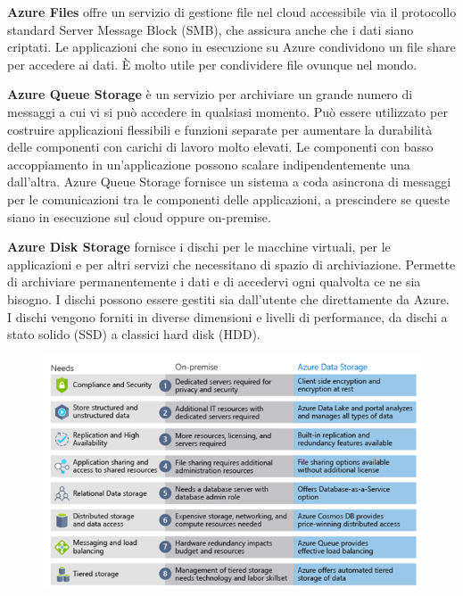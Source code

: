\textbf{Azure Files} offre un servizio di gestione file nel cloud accessibile via il protocollo standard Server Message Block (SMB), che assicura anche che i dati siano criptati. Le applicazioni che sono in esecuzione su Azure condividono un file share per accedere ai dati. È molto utile per condividere file ovunque nel mondo.

\textbf{Azure Queue Storage} è un servizio per archiviare un grande numero di messaggi a cui vi si può accedere in qualsiasi momento. Può essere utilizzato per costruire applicazioni flessibili e funzioni separate per aumentare la durabilità delle componenti con carichi di lavoro molto elevati. Le componenti con basso accoppiamento in un'applicazione possono scalare indipendentemente una dall'altra. Azure Queue Storage fornisce un sistema a coda asincrona di messaggi per le comunicazioni tra le componenti delle applicazioni, a prescindere se queste siano in esecuzione sul cloud oppure on-premise. 

\textbf{Azure Disk Storage} fornisce i dischi per le macchine virtuali, per le applicazioni e per altri servizi che necessitano di spazio di archiviazione. Permette di archiviare permanentemente i dati e di accedervi ogni qualvolta ce ne sia bisogno. I dischi possono essere gestiti sia dall'utente che direttamente da Azure. I dischi vengono forniti in diverse dimensioni e livelli di performance, da dischi a stato solido (SSD) a classici hard disk (HDD).

\begin{figure}[htb!]
    \centering
    \includegraphics[width=12cm]{./Images/cap14/14.5.png}
\end{figure}

